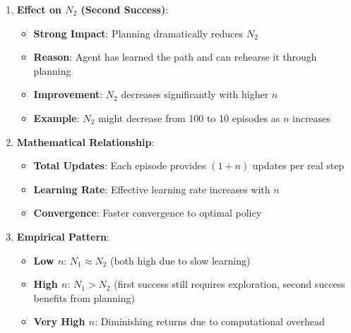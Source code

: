 \begin{itemize}
\begin{enumerate}
        \item \textbf{Effect on $N_2$ (Second Success)}:
        \begin{itemize}
            \item \textbf{Strong Impact}: Planning dramatically reduces $N_2$
            \item \textbf{Reason}: Agent has learned the path and can rehearse it through planning
            \item \textbf{Improvement}: $N_2$ decreases significantly with higher $n$
            \item \textbf{Example}: $N_2$ might decrease from 100 to 10 episodes as $n$ increases
        \end{itemize}
        
        \item \textbf{Mathematical Relationship}:
        \begin{itemize}
            \item \textbf{Total Updates}: Each episode provides $(1+n)$ updates per real step
            \item \textbf{Learning Rate}: Effective learning rate increases with $n$
            \item \textbf{Convergence}: Faster convergence to optimal policy
        \end{itemize}
        
        \item \textbf{Empirical Pattern}:
        \begin{itemize}
            \item \textbf{Low $n$}: $N_1 \approx N_2$ (both high due to slow learning)
            \item \textbf{High $n$}: $N_1 > N_2$ (first success still requires exploration, second success benefits from planning)
            \item \textbf{Very High $n$}: Diminishing returns due to computational overhead
        \end{itemize}
    \end{enumerate}
\end{itemize}

\vspace*{0.3cm}

